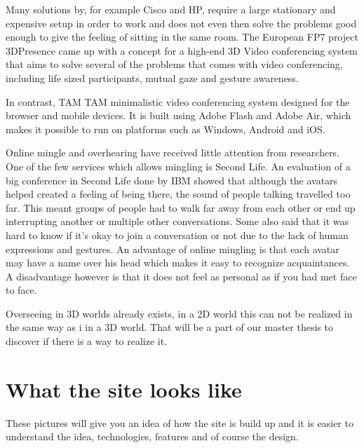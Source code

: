 \documentclass[12pt, titlepage]{article}
\begin{document}
Many solutions by, for example Cisco and HP, require a large stationary and expensive setup in order to work and does not even then solve the problems good enough to give the feeling of sitting in the same room. The European FP7 project 3DPresence\cite{26} came up with a concept for a high-end 3D Video conferencing system that aims to solve several of the problems that comes with video conferencing, including life sized participants, mutual gaze and gesture awareness.

In contrast, TAM TAM\cite{27} minimalistic video conferencing system designed for the browser and mobile devices. It is built using Adobe Flash and Adobe Air, which makes it possible to run on platforms such as Windows, Android and iOS.

Online mingle and overhearing have received little attention from researchers. One of the few services which allows mingling is Second Life\cite{5}. An evaluation of a big conference in Second Life done by IBM\cite{1} showed that although the avatars helped created a feeling of being there, the sound of people talking travelled too far. This meant groups of people had to walk far away from each other or end up interrupting another or multiple other conversations. Some also said that it was hard to know if it's okay to join a conversation or not due to the lack of human expressions and gestures. An advantage of online mingling is that each avatar may have a name over his head which makes it easy to recognize acquaintances. A disadvantage however is that it does not feel as personal as if you had met face to face\cite{6}.

Overseeing in 3D worlds already exists\cite{5}\cite{13}\cite{14}\cite{15}, in a 2D world this can not be realized in the same way as i in a 3D world. That will be a part of our master thesis to discover if there is a way to realize it.
\section{What the site looks like}
These pictures will give you an idea of how the site is build up and it is easier to understand the idea, technologies, features and of course the design.
\end{document}
